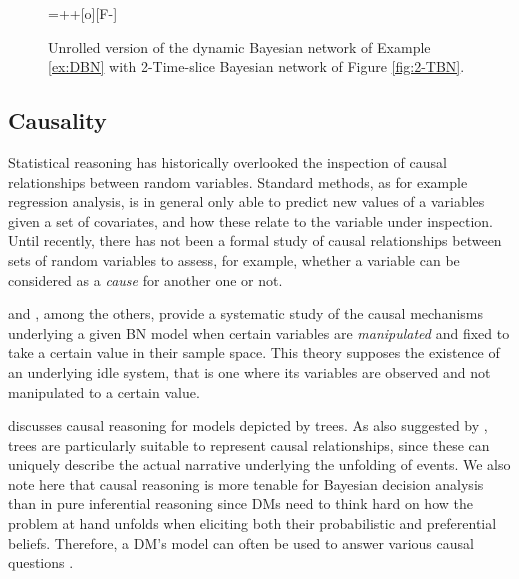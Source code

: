 \begin{figure}
\centerline{
\entrymodifiers={++[o][F-]}
}
\caption{Unrolled version of the dynamic Bayesian network of Example \ref{ex:DBN} with 2-Time-slice Bayesian network of Figure \ref{fig:2-TBN}.\label{fig:unrolled}}
\end{figure}

\subsection{Causality}
\label{sec:causality}
Statistical reasoning has historically overlooked the inspection of causal relationships between random variables. Standard methods, as for example regression analysis, is in general only able to predict new values of a variables given a set of covariates, and how these relate to the variable under inspection. Until recently, there has not been a formal study of causal relationships between sets of random variables to assess, for example, whether a variable can be considered as a \textit{cause} for another one or not.

 \citet{Pearl2000} and \citet{Spirtes1993}, among the others, provide a systematic study of the causal mechanisms underlying a given \gls{BN} model when certain variables are \textit{manipulated} and fixed to take a certain value in their sample space. This theory supposes the existence of an underlying idle system, that is one where its variables are observed and not manipulated to a certain value. 
 
\citet{Shafer1996} discusses causal reasoning for models depicted by trees. As also suggested by \citet{Smith2010}, trees are particularly suitable to represent causal relationships, since these can uniquely describe the actual narrative underlying the unfolding of events. We also note here that causal reasoning is more tenable for Bayesian decision analysis than in pure inferential reasoning since \glspl{DM} need to think hard on how the problem at hand unfolds when eliciting both their probabilistic and preferential beliefs. Therefore, a \gls{DM}'s model can often be used to answer various causal questions \citep{Smith2010}.

